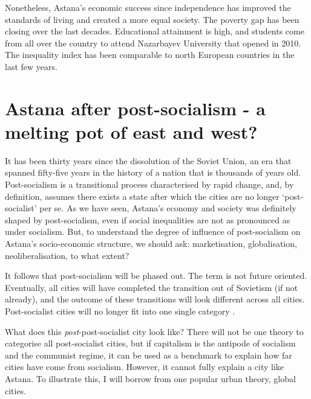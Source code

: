 \documentclass{article}
\begin{document}
Nonetheless, Astana's economic success since independence has improved the standards of living and created a more equal society. The poverty gap has been closing over the last decades. Educational attainment is high, and students come from all over the country to attend Nazarbayev University that opened in 2010. The inequality index has been comparable to north European countries in the last few years. %

\section{Astana after post-socialism - a melting pot of east and west?}


It has been thirty years since the dissolution of the Soviet Union, an era that spanned fifty-five years in the history of a nation that is thousands of years old. Post-socialism is a transitional process characterised by rapid change, and, by definition, assumes there exists a state after which the cities are no longer `post-socialist' per se. 
As we have seen, Astana's economy and society was definitely shaped by post-socialism, even if social inequalities are not as pronounced as under socialism. But, to understand the degree of influence of post-socialism on Astana's socio-economic structure, we should ask: marketisation, globalisation, neoliberalisation, to what extent?

It follows that post-socialism will be phased out. The term is not future oriented. Eventually, all cities will have completed the transition out of Sovietism (if not already), and the outcome of these transitions will look different across all cities. Post-socialist cities will no longer fit into one single category \parencite{hirt2016conceptual}.

What does this \textit{post}-post-socialist city look like? 
There will not be one theory to categorise all post-socialist cities, but if capitalism is the antipode of socialism and the communist regime, it can be used as a benchmark to explain how far cities have come from socialism. However, it cannot fully explain a city like Astana. To illustrate this, I will borrow from one popular urban theory, global cities.
\end{document}
